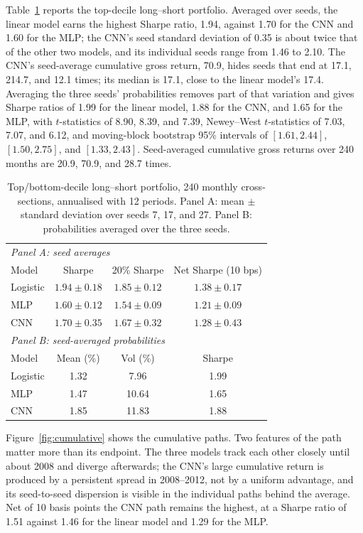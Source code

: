 \documentclass[10pt]{article}
\begin{document}
Table~\ref{tab:portfolio} reports the top-decile long--short portfolio. Averaged over seeds, the linear model earns the highest Sharpe ratio, 1.94, against 1.70 for the CNN and 1.60 for the MLP; the CNN's seed standard deviation of 0.35 is about twice that of the other two models, and its individual seeds range from 1.46 to 2.10. The CNN's seed-average cumulative gross return, 70.9, hides seeds that end at 17.1, 214.7, and 12.1 times; its median is 17.1, close to the linear model's 17.4. Averaging the three seeds' probabilities removes part of that variation and gives Sharpe ratios of 1.99 for the linear model, 1.88 for the CNN, and 1.65 for the MLP, with $t$-statistics of 8.90, 8.39, and 7.39, Newey--West $t$-statistics of 7.03, 7.07, and 6.12, and moving-block bootstrap 95\% intervals of $[1.61,2.44]$, $[1.50,2.75]$, and $[1.33,2.43]$. Seed-averaged cumulative gross returns over 240 months are 20.9, 70.9, and 28.7 times.

\begin{table}[t]
\centering
\small
\caption{Top/bottom-decile long--short portfolio, 240 monthly cross-sections, annualised with 12 periods. Panel A: mean $\pm$ standard deviation over seeds 7, 17, and 27. Panel B: probabilities averaged over the three seeds.}
\label{tab:portfolio}
\begin{tabular}{lccc}
\toprule
\multicolumn{4}{l}{\emph{Panel A: seed averages}} \\
Model & Sharpe & 20\% Sharpe & Net Sharpe (10 bps) \\
\midrule
Logistic & $1.94\pm0.18$ & $1.85\pm0.12$ & $1.38\pm0.17$ \\
MLP      & $1.60\pm0.12$ & $1.54\pm0.09$ & $1.21\pm0.09$ \\
CNN      & $1.70\pm0.35$ & $1.67\pm0.32$ & $1.28\pm0.43$ \\
\midrule
\multicolumn{4}{l}{\emph{Panel B: seed-averaged probabilities}} \\
Model & Mean (\%) & Vol (\%) & Sharpe \\
\midrule
Logistic & 1.32 & 7.96 & 1.99 \\
MLP      & 1.47 & 10.64 & 1.65 \\
CNN      & 1.85 & 11.83 & 1.88 \\
\bottomrule
\end{tabular}
\end{table}

Figure~\ref{fig:cumulative} shows the cumulative paths. Two features of the path matter more than its endpoint. The three models track each other closely until about 2008 and diverge afterwards; the CNN's large cumulative return is produced by a persistent spread in 2008--2012, not by a uniform advantage, and its seed-to-seed dispersion is visible in the individual paths behind the average. Net of 10 basis points the CNN path remains the highest, at a Sharpe ratio of 1.51 against 1.46 for the linear model and 1.29 for the MLP.
\end{document}
